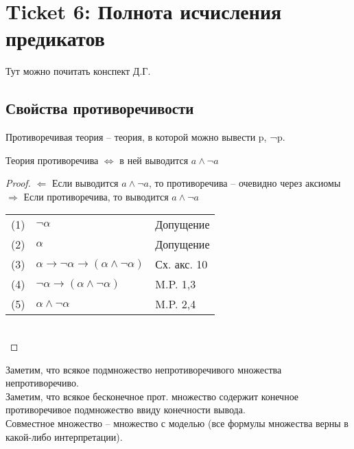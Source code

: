 \section{Ticket 6: Полнота исчисления предикатов}
\label{sec-8}
Тут можно почитать конспект Д.Г.
\subsection{Свойства противоречивости}
\label{sec-8-1}
Противоречивая теория – теория, в которой можно вывести p, ¬p.
\begin{lemma}
Теория противоречива $\Leftrightarrow$ в ней выводится $a \land \neg a$
\end{lemma}
\begin{proof}
$\Leftarrow$ Если выводится $a \land \neg a$, то противоречива -- очевидно через аксиомы\\
$\Rightarrow$ Если противоречива, то выводится $a \land \neg a$\\
\begin{tabular}{lll}
(1)& $\neg \alpha$& Допущение\\
(2)& $\alpha$& Допущение\\
(3)& $\alpha \to \neg \alpha \to (\alpha \land \neg \alpha)$& Сх. акс. 10\\
(4)& $\neg \alpha \to (\alpha \land \neg \alpha)$& M.P. 1,3\\
(5)& $\alpha \land \neg \alpha$& M.P. 2,4\\
\end{tabular}\\
\end{proof}
Заметим, что всякое подмножество непротиворечивого множества непротиворечиво.\\
Заметим, что всякое бесконечное прот. множество содержит конечное противоречивое подмножество ввиду конечности вывода.\\
Совместное множество – множество с моделью (все формулы множества верны в какой-либо интерпретации).
